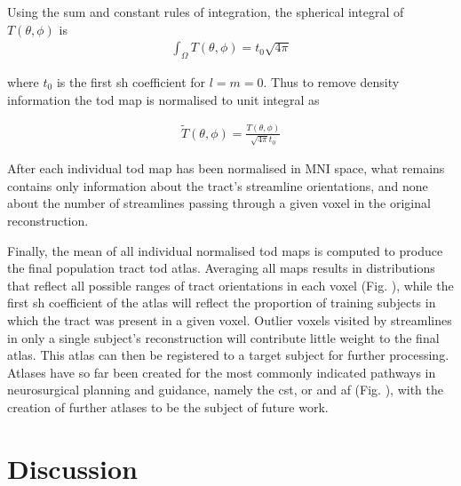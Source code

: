 Using the sum and constant rules of integration, the spherical integral of $T(\theta,\phi)$ is
\begin{align}
  \int_{\Omega} T(\theta,\phi) = t_0 \sqrt{4\pi}
\end{align}

where $t_0$ is the first \gls{sh} coefficient for $l=m=0$. Thus to remove density information the \gls{tod} map is normalised to unit integral as

\begin{align}
  \widetilde{T}(\theta, \phi) = \frac{T(\theta,\phi)}{\sqrt{4\pi} t_0}
\end{align}

After each individual \gls{tod} map has been normalised in MNI space, what remains contains only information about the tract's streamline orientations, and none about the number of streamlines passing through a given voxel in the original reconstruction.

Finally, the mean of all individual normalised \gls{tod} maps is computed to produce the final population tract \gls{tod} atlas.
Averaging all maps results in distributions that reflect all possible ranges of tract orientations in each voxel (Fig. ), while the first \gls{sh} coefficient of the atlas will reflect the proportion of training subjects in which the tract was present in a given voxel.
Outlier voxels visited by streamlines in only a single subject's reconstruction will contribute little weight to the final atlas.
This atlas can then be registered to a target subject for further processing.
Atlases have so far been created for the most commonly indicated pathways in neurosurgical planning and guidance, namely the \gls{cst}, \gls{or} and \gls{af} (Fig. ), with the creation of further atlases to be the subject of future work.

\section{Discussion}

